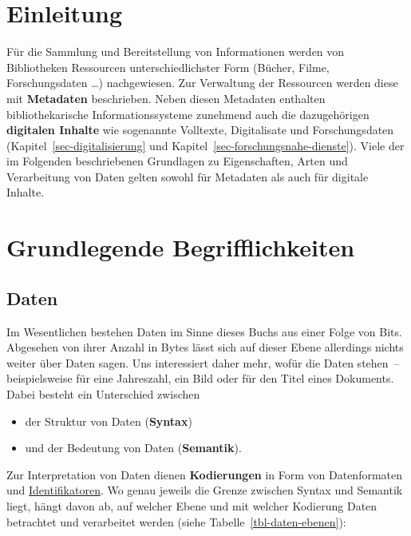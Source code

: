 \documentclass[
  11pt,
  letterpaper,
  DIV=11,
  twoside]{scrreprt}
\begin{document}
\section{Einleitung}\label{einleitung-5}

Für die Sammlung und Bereitstellung von Informationen werden von
Bibliotheken Ressourcen unterschiedlichster Form (Bücher, Filme,
Forschungsdaten \ldots) nachgewiesen. Zur Verwaltung der Ressourcen
werden diese mit \textbf{Metadaten} beschrieben. Neben diesen Metadaten
enthalten bibliothekarische Informationssysteme zunehmend auch die
dazugehörigen \textbf{digitalen Inhalte} wie sogenannte Volltexte,
Digitalisate und Forschungsdaten (Kapitel~\ref{sec-digitalisierung} und
Kapitel~\ref{sec-forschungsnahe-dienste}). Viele der im Folgenden
beschriebenen Grundlagen zu Eigenschaften, Arten und Verarbeitung von
Daten gelten sowohl für Metadaten als auch für digitale Inhalte.

\section{Grundlegende
Begrifflichkeiten}\label{grundlegende-begrifflichkeiten}

\subsection{Daten}\label{daten}

Im Wesentlichen bestehen Daten im Sinne dieses Buchs aus einer Folge von
Bits. Abgesehen von ihrer Anzahl in Bytes lässt sich auf dieser Ebene
allerdings nichts weiter über Daten sagen. Uns interessiert daher mehr,
wofür die Daten stehen~-- beispielsweise für eine Jahreszahl, ein Bild
oder für den Titel eines Dokuments. Dabei besteht ein Unterschied
zwischen

\begin{itemize}
\item
  der Struktur von Daten (\textbf{Syntax})
\item
  und der Bedeutung von Daten (\textbf{Semantik}).
\end{itemize}

Zur Interpretation von Daten dienen \textbf{Kodierungen} in Form von
Datenformaten und \hyperref[identifikatoren]{Identifikatoren}. Wo genau
jeweils die Grenze zwischen Syntax und Semantik liegt, hängt davon ab,
auf welcher Ebene und mit welcher Kodierung Daten betrachtet und
verarbeitet werden (siehe Tabelle~\ref{tbl-daten-ebenen}):
\end{document}
